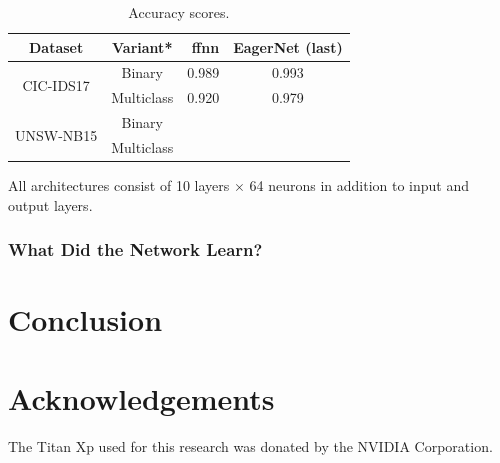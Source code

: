 \documentclass[conference]{IEEEtran}
\begin{document}
\begin{table}

\centering
\begin{tabular}{ccrc}
\toprule
\textbf{Dataset} & \textbf{Variant*} & \textbf{\gls{ffnn}} & \textbf{EagerNet (last)} \\
\midrule
\multirow{2}{*}{CIC-IDS17} & Binary & 0.989 & 0.993 \\
 & Multiclass & 0.920 & 0.979 \\
\midrule
\multirow{2}{*}{UNSW-NB15} & Binary & & \\
 & Multiclass & & \\
\midrule

\end{tabular}
\vspace{1ex}

{\raggedright * All architectures consist of 10 layers $\times$ 64 neurons in addition to input and output layers. \par}
\caption{Accuracy scores.}


\end{table}

\subsubsection{What Did the Network Learn?}







\section{Conclusion}


\section*{Acknowledgements}
The Titan Xp used for this research was donated by the NVIDIA Corporation.



\end{document}
